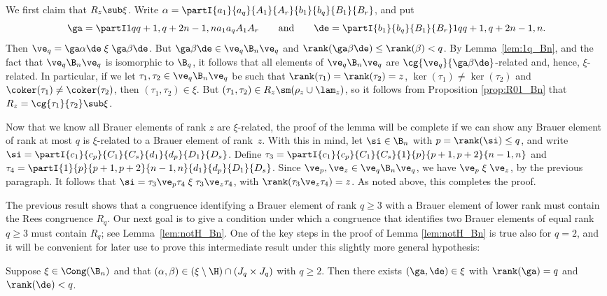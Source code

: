 \pf 
We first claim that $R_z\sub\xi$.  Write $\alpha=\partI{a_1}{a_q}{A_1}{A_r}{b_1}{b_q}{B_1}{B_r}$, and put
$$\ga=\partI1q{q+1,q+2}{n-1,n}{a_1}{a_q}{A_1}{A_r} \qquad\text{and}\qquad \de=\partI{b_1}{b_q}{B_1}{B_r}1q{q+1,q+2}{n-1,n}.$$
%
Then $\ve_q=\ga\alpha\de\mathrel\xi\ga\beta\de$.  But $\ga\beta\de\in\ve_q\B_n\ve_q$ and ${\rank(\ga\beta\de)\leq\rank(\beta)<q}$.  By Lemma~\ref{lem:1q_Bn}, and the fact that $\ve_q\B_n\ve_q$ is isomorphic to $\B_q$, it follows that all elements of $\ve_q\B_n\ve_q$ are $\cg{\ve_q}{\ga\beta\de}$-related and, hence, $\xi$-related.  In particular, if we let $\tau_1,\tau_2\in\ve_q\B_n\ve_q$ be such that $\rank(\tau_1)=\rank(\tau_2)=z$, $\ker(\tau_1)\not=\ker(\tau_2)$ and $\coker(\tau_1)\not=\coker(\tau_2)$, then $(\tau_1,\tau_2)\in\xi$.  But $(\tau_1,\tau_2)\in R_z\sm(\rho_z\cup\lam_z)$, so it follows from Proposition \ref{prop:R01_Bn} that $R_z=\cg{\tau_1}{\tau_2}\sub\xi$.

Now that we know all Brauer elements of rank $z$ are $\xi$-related, the proof of the lemma will be complete if we can show any Brauer element of rank at most $q$ is $\xi$-related to a Brauer element of rank~$z$.  With this in mind, let $\si\in\B_n$ with $p=\rank(\si)\leq q$, and write $\si=\partI{c_1}{c_p}{C_1}{C_s}{d_1}{d_p}{D_1}{D_s}$.  Define ${\tau_3=\partI{c_1}{c_p}{C_1}{C_s}{1}{p}{p+1,p+2}{n-1,n}}$ and $\tau_4=\partI{1}{p}{p+1,p+2}{n-1,n}{d_1}{d_p}{D_1}{D_s}$.  Since $\ve_p,\ve_z\in\ve_q\B_n\ve_q$, we have $\ve_p \mathrel\xi \ve_z$, by the previous paragraph.  It follows that $\si = \tau_3\ve_p\tau_4 \mathrel\xi \tau_3\ve_z\tau_4$, with $\rank(\tau_3\ve_z\tau_4)=z$.  As noted above, this completes the proof. \epf

The previous result shows that a congruence identifying a Brauer element of rank $q\geq3$ with a Brauer element of lower rank must contain the Rees congruence $R_q$.
%
Our next goal is to give a condition under which a congruence that identifies two Brauer elements of equal rank $q\geq3$ must contain $R_q$; see Lemma~\ref{lem:notH_Bn}.
%
One of the key steps in the proof of Lemma \ref{lem:notH_Bn} is true also for $q=2$, and it will be convenient for later use to prove this intermediate result under this slightly more general hypothesis:



\begin{lemma}\label{lem:notH_prelim_Bn}
  Suppose $\xi\in\Cong(\B_n)$ and that $(\alpha,\beta)\in (\xi\setminus{\H})\cap
  (J_q\times J_q)$ with $q\geq2$.  Then there exists $(\ga,\de)\in\xi$ with
  $\rank(\ga)=q$ and $\rank(\de)<q$.
\end{lemma}

